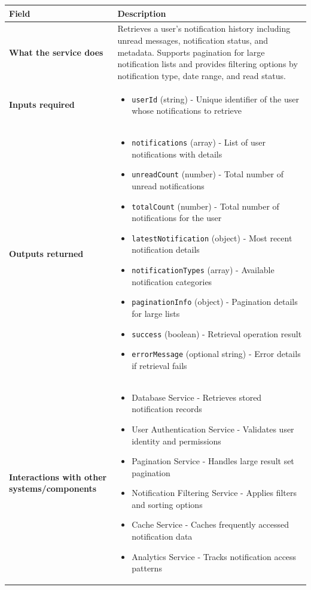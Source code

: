 \documentclass[11pt,a4paper]{article}
\begin{document}
\begin{longtable}{|p{4cm}|p{12cm}|}
\hline
\textbf{Field} & \textbf{Description} \\
\hline
\textbf{What the service does} & 
Retrieves a user's notification history including unread messages, notification status, and metadata. Supports pagination for large notification lists and provides filtering options by notification type, date range, and read status. \\
\hline
\textbf{Inputs required} & 
\begin{itemize}[nosep]
\item \texttt{userId} (string) - Unique identifier of the user whose notifications to retrieve
\end{itemize} \\
\hline
\textbf{Outputs returned} & 
\begin{itemize}[nosep]
\item \texttt{notifications} (array) - List of user notifications with details
\item \texttt{unreadCount} (number) - Total number of unread notifications
\item \texttt{totalCount} (number) - Total number of notifications for the user
\item \texttt{latestNotification} (object) - Most recent notification details
\item \texttt{notificationTypes} (array) - Available notification categories
\item \texttt{paginationInfo} (object) - Pagination details for large lists
\item \texttt{success} (boolean) - Retrieval operation result
\item \texttt{errorMessage} (optional string) - Error details if retrieval fails
\end{itemize} \\
\hline
\textbf{Interactions with other systems/components} & 
\begin{itemize}[nosep]
\item Database Service - Retrieves stored notification records
\item User Authentication Service - Validates user identity and permissions
\item Pagination Service - Handles large result set pagination
\item Notification Filtering Service - Applies filters and sorting options
\item Cache Service - Caches frequently accessed notification data
\item Analytics Service - Tracks notification access patterns
\end{itemize} \\
\hline
\end{longtable}
\end{document}
